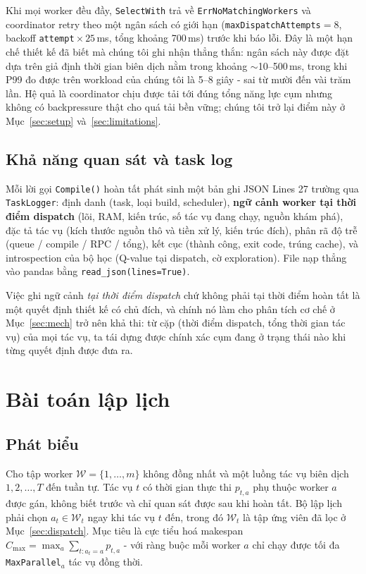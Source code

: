 \documentclass[final,5p,times,twocolumn]{elsarticle}
\begin{document}
Khi mọi worker đều đầy, \texttt{SelectWith} trả về \texttt{ErrNoMatchingWorkers} và coordinator retry theo một ngân sách có giới hạn (\texttt{maxDispatchAttempts}${}=8$, backoff \texttt{attempt}${}\times25$\,ms, tổng khoảng 700\,ms) trước khi báo lỗi. Đây là một hạn chế thiết kế đã biết mà chúng tôi ghi nhận thẳng thắn: ngân sách này được đặt dựa trên giả định thời gian biên dịch nằm trong khoảng $\sim$10--500\,ms, trong khi P99 đo được trên workload của chúng tôi là 5--8 giây - sai từ mười đến vài trăm lần. Hệ quả là coordinator chịu được tải tới đúng tổng năng lực cụm nhưng không có backpressure thật cho quá tải bền vững; chúng tôi trở lại điểm này ở Mục~\ref{sec:setup} và~\ref{sec:limitations}.

\subsection{Khả năng quan sát và task log}
\label{sec:log}

Mỗi lời gọi \texttt{Compile()} hoàn tất phát sinh một bản ghi JSON Lines 27 trường qua \texttt{TaskLogger}: định danh (task, loại build, scheduler), \textbf{ngữ cảnh worker tại thời điểm dispatch} (lõi, RAM, kiến trúc, số tác vụ đang chạy, nguồn khám phá), đặc tả tác vụ (kích thước nguồn thô và tiền xử lý, kiến trúc đích), phân rã độ trễ (queue / compile / RPC / tổng), kết cục (thành công, exit code, trúng cache), và introspection của bộ học (Q-value tại dispatch, cờ exploration). File nạp thẳng vào pandas bằng \texttt{read\_json(lines=True)}.

Việc ghi ngữ cảnh \emph{tại thời điểm dispatch} chứ không phải tại thời điểm hoàn tất là một quyết định thiết kế có chủ đích, và chính nó làm cho phân tích cơ chế ở Mục~\ref{sec:mech} trở nên khả thi: từ cặp (thời điểm dispatch, tổng thời gian tác vụ) của mọi tác vụ, ta tái dựng được chính xác cụm đang ở trạng thái nào khi từng quyết định được đưa ra.

\section{Bài toán lập lịch}
\label{sec:problem}

\subsection{Phát biểu}

Cho tập worker $\mathcal{W}=\{1,\dots,m\}$ không đồng nhất và một luồng tác vụ biên dịch $1,2,\dots,T$ đến tuần tự. Tác vụ $t$ có thời gian thực thi $p_{t,a}$ phụ thuộc worker $a$ được gán, không biết trước và chỉ quan sát được sau khi hoàn tất. Bộ lập lịch phải chọn $a_t\in\mathcal{W}_t$ ngay khi tác vụ $t$ đến, trong đó $\mathcal{W}_t$ là tập ứng viên đã lọc ở Mục~\ref{sec:dispatch}. Mục tiêu là cực tiểu hoá makespan $C_{\max}=\max_a\sum_{t:a_t=a}p_{t,a}$ - với ràng buộc mỗi worker $a$ chỉ chạy được tối đa \texttt{MaxParallel}$_a$ tác vụ đồng thời.
\end{document}
